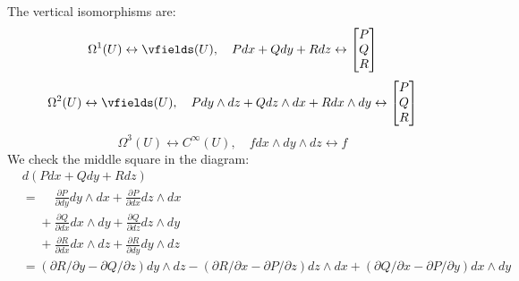 \begin{frame}
  The vertical isomorphisms are:
  \begin{displaymath}
    \Omega^1(U) \leftrightarrow \vfields(U), \quad
    Pdx + Qdy + Rdz \leftrightarrow
    \begin{bmatrix}
      P \\ Q \\ R
    \end{bmatrix}
  \end{displaymath}
  \begin{displaymath}
    \Omega^2(U) \leftrightarrow \vfields(U), \quad
    P dy \wedge dz + Q dz \wedge dx + R dx \wedge dy 
    \leftrightarrow 
    \begin{bmatrix}
      P \\ Q \\ R
    \end{bmatrix}
  \end{displaymath}
  \begin{displaymath}
    \Omega^3(U) \leftrightarrow C^{\infty}(U), \quad
    f dx \wedge dy \wedge dz \leftrightarrow f
  \end{displaymath}
  We check the middle square in the diagram:
  \begin{align*}
    &d(Pdx + Qdy + Rdz) 
    \\
    &=
    \phantom{+}
    \frac{\partial P}{\partial dy} dy \wedge dx +
    \frac{\partial P}{\partial dx} dz \wedge dx
    \\
    &\phantom{=}
    +
    \frac{\partial Q}{\partial dx} dx \wedge dy +
    \frac{\partial Q}{\partial dz} dz \wedge dy
    \\
    &\phantom{=}
    +
    \frac{\partial R}{\partial dx} dx \wedge dz +
    \frac{\partial R}{\partial dy} dy \wedge dz 
    \\
    &=
      (\partial R / \partial y - \partial Q / \partial z) dy \wedge dz 
      -(\partial R / \partial x - \partial P / \partial z) dz \wedge dx
      + (\partial Q / \partial x - \partial P / \partial y) dx \wedge dy
  \end{align*}
\end{frame}
